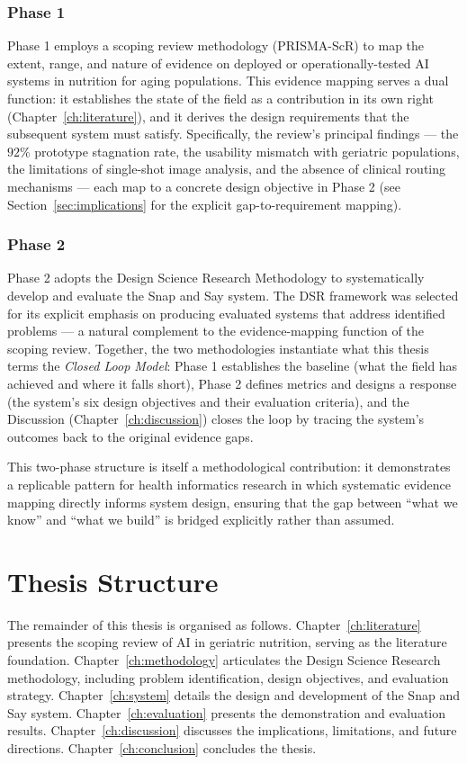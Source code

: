 \subsubsection{Phase 1}
Phase 1 employs a scoping review methodology (PRISMA-ScR) to map the extent, range, and nature of evidence on deployed or operationally-tested AI systems in nutrition for aging populations. This evidence mapping serves a dual function: it establishes the state of the field as a contribution in its own right (Chapter~\ref{ch:literature}), and it derives the design requirements that the subsequent system must satisfy. Specifically, the review's principal findings --- the $92\%$ prototype stagnation rate, the usability mismatch with geriatric populations, the limitations of single-shot image analysis, and the absence of clinical routing mechanisms --- each map to a concrete design objective in Phase 2 (see Section~\ref{sec:implications} for the explicit gap-to-requirement mapping).

\subsubsection{Phase 2}
Phase 2 adopts the Design Science Research Methodology \citep{peffersDesignScienceResearch2007} to systematically develop and evaluate the Snap and Say system. The DSR framework was selected for its explicit emphasis on producing evaluated systems that address identified problems --- a natural complement to the evidence-mapping function of the scoping review. Together, the two methodologies instantiate what this thesis terms the \emph{Closed Loop Model}: Phase 1 establishes the baseline (what the field has achieved and where it falls short), Phase 2 defines metrics and designs a response (the system's six design objectives and their evaluation criteria), and the Discussion (Chapter~\ref{ch:discussion}) closes the loop by tracing the system's outcomes back to the original evidence gaps.

This two-phase structure is itself a methodological contribution: it demonstrates a replicable pattern for health informatics research in which systematic evidence mapping directly informs system design, ensuring that the gap between ``what we know'' and ``what we build'' is bridged explicitly rather than assumed.

\section{Thesis Structure}

The remainder of this thesis is organised as follows. Chapter~\ref{ch:literature} presents the scoping review of AI in geriatric nutrition, serving as the literature foundation. Chapter~\ref{ch:methodology} articulates the Design Science Research methodology, including problem identification, design objectives, and evaluation strategy. Chapter~\ref{ch:system} details the design and development of the Snap and Say system. Chapter~\ref{ch:evaluation} presents the demonstration and evaluation results. Chapter~\ref{ch:discussion} discusses the implications, limitations, and future directions. Chapter~\ref{ch:conclusion} concludes the thesis.
